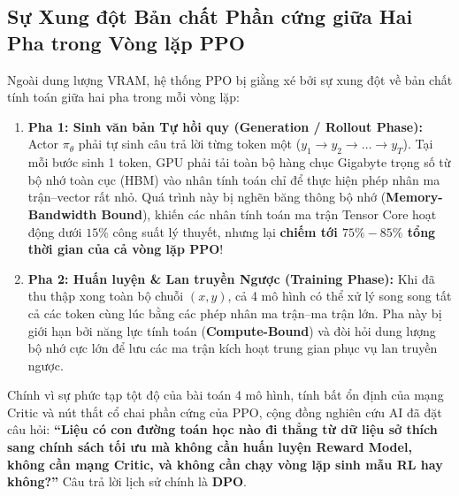 \subsection{Sự Xung đột Bản chất Phần cứng giữa Hai Pha trong Vòng lặp PPO}
Ngoài dung lượng VRAM, hệ thống PPO bị giằng xé bởi sự xung đột về bản chất tính toán giữa hai pha trong mỗi vòng lặp:
\begin{enumerate}[leftmargin=1.2cm]
    \item \textbf{Pha 1: Sinh văn bản Tự hồi quy (Generation / Rollout Phase):}
    Actor $\pi_\theta$ phải tự sinh câu trả lời từng token một ($y_1 \to y_2 \to \dots \to y_T$). Tại mỗi bước sinh 1 token, GPU phải tải toàn bộ hàng chục Gigabyte trọng số từ bộ nhớ toàn cục (HBM) vào nhân tính toán chỉ để thực hiện phép nhân ma trận--vector rất nhỏ. Quá trình này bị nghẽn băng thông bộ nhớ (\textbf{Memory-Bandwidth Bound}), khiến các nhân tính toán ma trận Tensor Core hoạt động dưới $15\%$ công suất lý thuyết, nhưng lại \textbf{chiếm tới $75\% - 85\%$ tổng thời gian của cả vòng lặp PPO}!
    \item \textbf{Pha 2: Huấn luyện \& Lan truyền Ngược (Training Phase):}
    Khi đã thu thập xong toàn bộ chuỗi $(x, y)$, cả 4 mô hình có thể xử lý song song tất cả các token cùng lúc bằng các phép nhân ma trận--ma trận lớn. Pha này bị giới hạn bởi năng lực tính toán (\textbf{Compute-Bound}) và đòi hỏi dung lượng bộ nhớ cực lớn để lưu các ma trận kích hoạt trung gian phục vụ lan truyền ngược.
\end{enumerate}

Chính vì sự phức tạp tột độ của bài toán 4 mô hình, tính bất ổn định của mạng Critic và nút thắt cổ chai phần cứng của PPO, cộng đồng nghiên cứu AI đã đặt câu hỏi: \textbf{``Liệu có con đường toán học nào đi thẳng từ dữ liệu sở thích sang chính sách tối ưu mà không cần huấn luyện Reward Model, không cần mạng Critic, và không cần chạy vòng lặp sinh mẫu RL hay không?''} Câu trả lời lịch sử chính là \textbf{DPO}.
